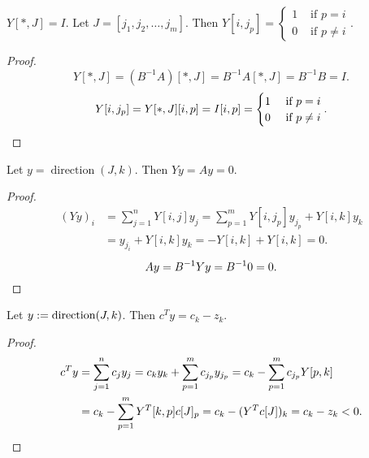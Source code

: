 \documentclass[a4paper, 12pt, fleqn]{article}
\DeclareMathOperator{\direction}{direction}
\newenvironment*{longProof}{\begin{proof}}{\end{proof}}
\begin{document}
\begin{lemma}
\label{thm:YJ-is-I}
$Y[*, J] = I$.
Let $J = [j_1, j_2, \ldots, j_m]$.
Then $Y[i, j_p] = \begin{cases}1 & \textrm{ if } p = i
\\ 0 & \textrm{ if } p \neq i\end{cases}$.
\end{lemma}
\begin{longProof}
\[ Y[*, J] = (B^{-1}A)[*, J] = B^{-1}A[*, J] = B^{-1}B = I. \]
\[ Y[i, j_p] = Y[*, J][i, p] = I[i, p] = \begin{cases}1 & \textrm{ if } p = i
\\ 0 & \textrm{ if } p \neq i\end{cases}. \qedhere \]
\end{longProof}

\begin{lemma}
\label{thm:y-in-nullsp}
Let $y = \direction(J, k)$. Then $Yy = Ay = 0$.
\end{lemma}
\begin{longProof}
\begin{align*}
(Yy)_i &= \sum_{j=1}^n Y[i, j]y_j
= \sum_{p=1}^m Y[i, j_p]y_{j_p} + Y[i, k]y_k
\\ &= y_{j_i} + Y[i, k]y_k
= -Y[i, k] + Y[i, k] = 0.
\end{align*}
\[ Ay = B^{-1}Yy = B^{-1}0 = 0. \qedhere \]
\end{longProof}

\begin{lemma}
\label{thm:y-reduces-cost}
Let $y \defeq \direction(J, k)$. Then $c^Ty = c_k - z_k$.
\end{lemma}
\begin{longProof}
\begin{align*}
c^Ty &= \sum_{j=1}^n c_jy_j = c_ky_k + \sum_{p=1}^m c_{j_p}y_{j_p}
= c_k - \sum_{p=1}^m c_{j_p}Y[p, k]
\\ &= c_k - \sum_{p=1}^m Y^T[k, p]c[J]_p
= c_k - (Y^Tc[J])_k = c_k - z_k < 0.
\qedhere \end{align*}
\end{longProof}
\end{document}
